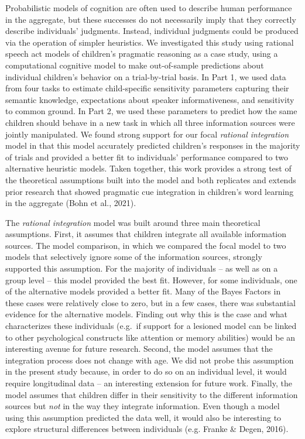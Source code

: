 \documentclass[
  man,mask,floatsintext]{apa6}
\begin{document}
Probabilistic models of cognition are often used to describe human performance in the aggregate, but these successes do not necessarily imply that they correctly describe individuals' judgments. Instead, individual judgments could be produced via the operation of simpler heuristics. We investigated this study using rational speech act models of children's pragmatic reasoning as a case study, using a computational cognitive model to make out-of-sample predictions about individual children's behavior on a trial-by-trial basis. In Part 1, we used data from four tasks to estimate child-specific sensitivity parameters capturing their semantic knowledge, expectations about speaker informativeness, and sensitivity to common ground. In Part 2, we used these parameters to predict how the same children should behave in a new task in which all three information sources were jointly manipulated. We found strong support for our focal \emph{rational integration} model in that this model accurately predicted children's responses in the majority of trials and provided a better fit to individuals' performance compared to two alternative heuristic models. Taken together, this work provides a strong test of the theoretical assumptions built into the model and both replicates and extends prior research that showed pragmatic cue integration in children's word learning in the aggregate (Bohn et al., 2021).

The \emph{rational integration} model was built around three main theoretical assumptions. First, it assumes that children integrate all available information sources. The model comparison, in which we compared the focal model to two models that selectively ignore some of the information sources, strongly supported this assumption. For the majority of individuals -- as well as on a group level -- this model provided the best fit. However, for some individuals, one of the alternative models provided a better fit. Many of the Bayes Factors in these cases were relatively close to zero, but in a few cases, there was substantial evidence for the alternative models. Finding out why this is the case and what characterizes these individuals (e.g.~if support for a lesioned model can be linked to other psychological constructs like attention or memory abilities) would be an interesting avenue for future research. Second, the model assumes that the integration process does not change with age. We did not probe this assumption in the present study because, in order to do so on an individual level, it would require longitudinal data -- an interesting extension for future work. Finally, the model assumes that children differ in their sensitivity to the different information sources but \emph{not} in the way they integrate information. Even though a model using this assumption predicted the data well, it would also be interesting to explore structural differences between individuals (e.g. Franke \& Degen, 2016).
\end{document}

